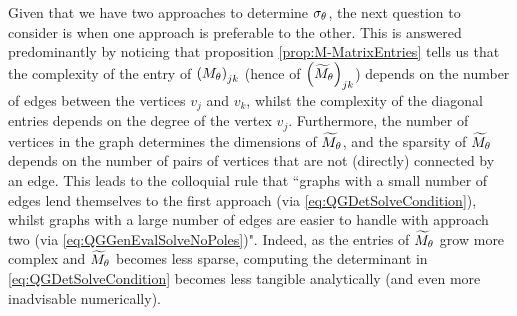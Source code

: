 Given that we have two approaches to determine $\sigma_\theta$, the next question to consider is when one approach is preferable to the other.
This is answered predominantly by noticing that proposition \ref{prop:M-MatrixEntries} tells us that the complexity of the entry of $\left( M_\theta \right)_{jk}$ (hence of $\left( \widetilde{M}_\theta \right)_{jk}$) depends on the number of edges between the vertices $v_j$ and $v_k$, whilst the complexity of the diagonal entries depends on the degree of the vertex $v_j$.
Furthermore, the number of vertices in the graph determines the dimensions of $\widetilde{M}_\theta$, and the sparsity of $\widetilde{M}_\theta$ depends on the number of pairs of vertices that are not (directly) connected by an edge.
This leads to the colloquial rule that ``graphs with a small number of edges lend themselves to the first approach (via \eqref{eq:QGDetSolveCondition}), whilst graphs with a large number of edges are easier to handle with approach two (via \eqref{eq:QGGenEvalSolveNoPoles})".
Indeed, as the entries of $\widetilde{M}_\theta$ grow more complex and $\widetilde{M}_\theta$ becomes less sparse, computing the determinant in \eqref{eq:QGDetSolveCondition} becomes less tangible analytically (and even more inadvisable numerically).

